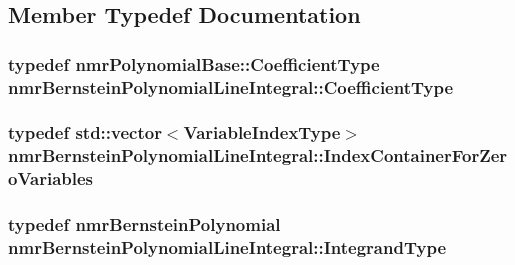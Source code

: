 \subsection{Member Typedef Documentation}
\hypertarget{classnmr_bernstein_polynomial_line_integral_a0dc7480d6f60af6d3d8da6e32444edf7}{
\subsubsection[{Coefficient\-Type}]{\setlength{\rightskip}{0pt plus 5cm}typedef {\bf nmr\-Polynomial\-Base\-::\-Coefficient\-Type} {\bf nmr\-Bernstein\-Polynomial\-Line\-Integral\-::\-Coefficient\-Type}}}\label{classnmr_bernstein_polynomial_line_integral_a0dc7480d6f60af6d3d8da6e32444edf7}
\hypertarget{classnmr_bernstein_polynomial_line_integral_ad240bb2714fe8f3ce33ba2fa696931f8}{
\subsubsection[{Index\-Container\-For\-Zero\-Variables}]{\setlength{\rightskip}{0pt plus 5cm}typedef std\-::vector$<${\bf Variable\-Index\-Type}$>$ {\bf nmr\-Bernstein\-Polynomial\-Line\-Integral\-::\-Index\-Container\-For\-Zero\-Variables}\hspace{0.3cm}{\ttfamily [protected]}}}\label{classnmr_bernstein_polynomial_line_integral_ad240bb2714fe8f3ce33ba2fa696931f8}
\hypertarget{classnmr_bernstein_polynomial_line_integral_a5c7945eacbf7d3d225de9d11bbac138c}{
\subsubsection[{Integrand\-Type}]{\setlength{\rightskip}{0pt plus 5cm}typedef {\bf nmr\-Bernstein\-Polynomial} {\bf nmr\-Bernstein\-Polynomial\-Line\-Integral\-::\-Integrand\-Type}}}\label{classnmr_bernstein_polynomial_line_integral_a5c7945eacbf7d3d225de9d11bbac138c}
